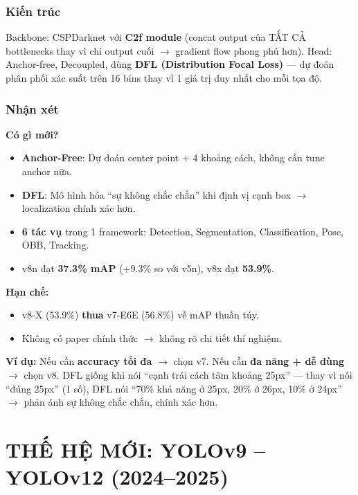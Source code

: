 \documentclass[12pt,a4paper]{report}
\begin{document}
\subsection{Kiến trúc}
Backbone: CSPDarknet với \textbf{C2f module} (concat output của TẤT CẢ bottlenecks thay vì chỉ output cuối $\rightarrow$ gradient flow phong phú hơn). Head: Anchor-free, Decoupled, dùng \textbf{DFL (Distribution Focal Loss)} --- dự đoán phân phối xác suất trên 16 bins thay vì 1 giá trị duy nhất cho mỗi tọa độ.

\subsection{Nhận xét}

\textbf{Có gì mới?}
\begin{itemize}
    \item \textbf{Anchor-Free}: Dự đoán center point + 4 khoảng cách, không cần tune anchor nữa.
    \item \textbf{DFL}: Mô hình hóa ``sự không chắc chắn'' khi định vị cạnh box $\rightarrow$ localization chính xác hơn.
    \item \textbf{6 tác vụ} trong 1 framework: Detection, Segmentation, Classification, Pose, OBB, Tracking.
    \item v8n đạt \textbf{37.3\% mAP} (+9.3\% so với v5n), v8x đạt \textbf{53.9\%}.
\end{itemize}

\textbf{Hạn chế:}
\begin{itemize}
    \item v8-X (53.9\%) \textbf{thua} v7-E6E (56.8\%) về mAP thuần túy.
    \item Không có paper chính thức $\rightarrow$ không rõ chi tiết thí nghiệm.
\end{itemize}

\textbf{Ví dụ:} Nếu cần \textbf{accuracy tối đa} $\rightarrow$ chọn v7. Nếu cần \textbf{đa năng + dễ dùng} $\rightarrow$ chọn v8. DFL giống khi nói ``cạnh trái cách tâm khoảng 25px'' --- thay vì nói ``đúng 25px'' (1 số), DFL nói ``70\% khả năng ở 25px, 20\% ở 26px, 10\% ở 24px'' $\rightarrow$ phản ánh sự không chắc chắn, chính xác hơn.



\chapter{THẾ HỆ MỚI: YOLOv9 -- YOLOv12 (2024--2025)}
\end{document}
